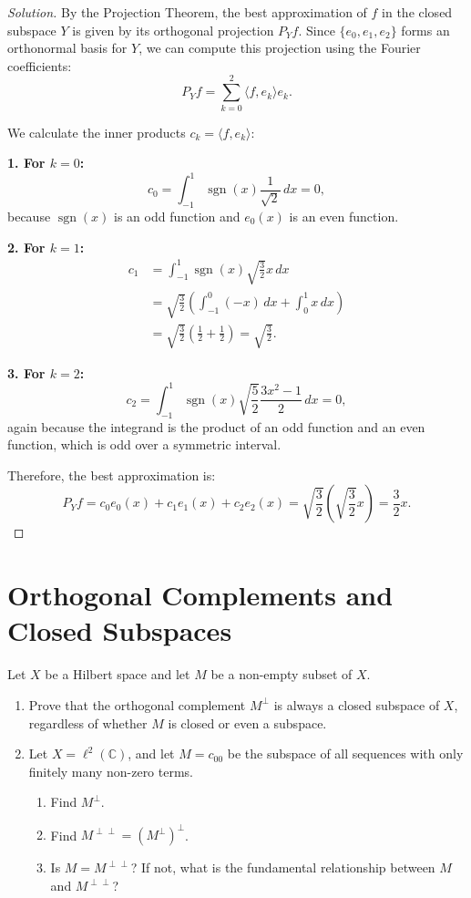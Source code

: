 \documentclass{article}
\begin{document}
\begin{proof}[Solution]
    By the Projection Theorem, the best approximation of $f$ in the closed subspace $Y$ is given by its orthogonal projection $P_Y f$. Since $\{e_0, e_1, e_2\}$ forms an orthonormal basis for $Y$, we can compute this projection using the Fourier coefficients:
    \[ P_Y f = \sum_{k=0}^2 \langle f, e_k \rangle e_k. \]
    
    We calculate the inner products $c_k = \langle f, e_k \rangle$:
    
    \textbf{1. For $k=0$:}
    \[ c_0 = \int_{-1}^1 \operatorname{sgn}(x) \frac{1}{\sqrt{2}} \, dx = 0, \]
    because $\operatorname{sgn}(x)$ is an odd function and $e_0(x)$ is an even function.
    
    \textbf{2. For $k=1$:}
    \begin{align*}
        c_1 &= \int_{-1}^1 \operatorname{sgn}(x) \sqrt{\frac{3}{2}} x \, dx \\
        &= \sqrt{\frac{3}{2}} \left( \int_{-1}^0 (-x) \, dx + \int_0^1 x \, dx \right) \\
        &= \sqrt{\frac{3}{2}} \left( \frac{1}{2} + \frac{1}{2} \right) = \sqrt{\frac{3}{2}}.
    \end{align*}
    
    \textbf{3. For $k=2$:}
    \[ c_2 = \int_{-1}^1 \operatorname{sgn}(x) \sqrt{\frac{5}{2}} \frac{3x^2 - 1}{2} \, dx = 0, \]
    again because the integrand is the product of an odd function and an even function, which is odd over a symmetric interval.
    
    Therefore, the best approximation is:
    \[ P_Y f = c_0 e_0(x) + c_1 e_1(x) + c_2 e_2(x) = \sqrt{\frac{3}{2}} \left( \sqrt{\frac{3}{2}} x \right) = \frac{3}{2}x. \]
\end{proof}

\section{Orthogonal Complements and Closed Subspaces}

\begin{problem}
    Let $X$ be a Hilbert space and let $M$ be a non-empty subset of $X$.
    \begin{enumerate}
        \item[(a)] Prove that the orthogonal complement $M^\perp$ is always a closed subspace of $X$, regardless of whether $M$ is closed or even a subspace.
        \item[(b)] Let $X = \ell^2(\mathbb{C})$, and let $M = c_{00}$ be the subspace of all sequences with only finitely many non-zero terms.
        \begin{enumerate}
            \item[(i)] Find $M^\perp$.
            \item[(ii)] Find $M^{\perp\perp} = (M^\perp)^\perp$.
            \item[(iii)] Is $M = M^{\perp\perp}$? If not, what is the fundamental relationship between $M$ and $M^{\perp\perp}$?
        \end{enumerate}
    \end{enumerate}
\end{problem}
\end{document}
